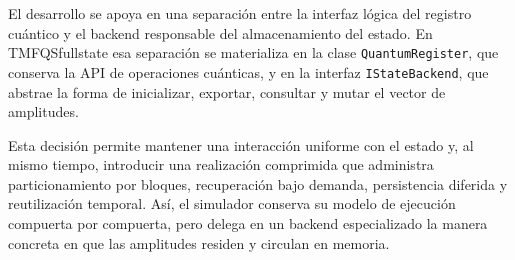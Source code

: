 El desarrollo se apoya en una separación entre la interfaz lógica del registro cuántico y
el backend responsable del almacenamiento del estado. En TMFQSfullstate esa
separación se materializa en la clase \texttt{QuantumRegister}, que conserva la API de
operaciones cuánticas, y en la interfaz \texttt{IStateBackend}, que abstrae la forma de
inicializar, exportar, consultar y mutar el vector de amplitudes.

Esta decisión permite mantener una interacción uniforme con el estado y, al mismo
tiempo, introducir una realización comprimida que administra particionamiento por
bloques, recuperación bajo demanda, persistencia diferida y reutilización temporal. Así,
el simulador conserva su modelo de ejecución compuerta por compuerta, pero delega en
un backend especializado la manera concreta en que las amplitudes residen y circulan en
memoria.
